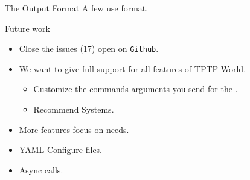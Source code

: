 \documentclass[newPxFont]{beamer}
\begin{document}
\begin{frame}{The Output Format}
A few \atps use  format.
\begin{table}
\label{table:1}
\centering
\caption{Some examples of outputs when an ATP finishes successfully}
\vspace*{1.5mm}
\end{table}
\end{frame}

\begin{frame}{Future work}
\begin{itemize}
\item Close the issues (17) open on \texttt{Github}.
\item We want to give full support for all features of TPTP World.
\begin{itemize}
  \item Customize the commands arguments you send for the \atps.
  \item Recommend Systems.
\end{itemize}
\item More features focus on \apia needs.
\item YAML Configure files.
\item Async calls.
\end{itemize}
\end{frame}



\end{document}
